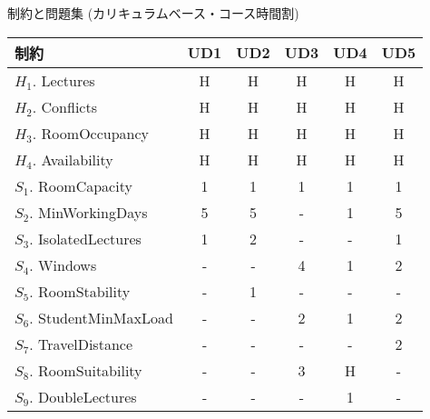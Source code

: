 \documentclass[11pt,dvipdfmx]{beamer}
\begin{document}
\begin{frame}{制約と問題集 (カリキュラムベース・コース時間割)}
  \begin{block}{}\small
    \begin{center}
      \begin{tabular}{l|ccccc}%
        制約                      &  UD1  &  UD2  &  UD3  &  UD4  &  UD5  \\
        \hline
        $H_1$. Lectures           &  H    &  H    &  H    &  H    &  H    \\
        $H_2$. Conflicts          &  H    &  H    &  H    &  H    &  H    \\
        $H_3$. RoomOccupancy      &  H    &  H    &  H    &  H    &  H    \\
        $H_4$. Availability       &  H    &  H    &  H    &  H    &  H    \\
        $S_1$. RoomCapacity       &  1    &  1    &  1    &  1    &  1    \\
        $S_2$. MinWorkingDays     &  5    &  5    &  -    &  1    &  5    \\
        $S_3$. IsolatedLectures   &  1    &  2    &  -    &  -    &  1    \\
        $S_4$. Windows            &  -    &  -    &  4    &  1    &  2    \\
        $S_5$. RoomStability      &  -    &  1    &  -    &  -    &  -    \\
        $S_6$. StudentMinMaxLoad  &  -    &  -    &  2    &  1    &  2    \\
        $S_7$. TravelDistance     &  -    &  -    &  -    &  -    &  2    \\
        $S_8$. RoomSuitability    &  -    &  -    &  3    &  H    &  -    \\
        $S_9$. DoubleLectures     &  -    &  -    &  -    &  1    &  -  
      \end{tabular}
    \end{center}
  \end{block}
\end{frame}
\end{document}
